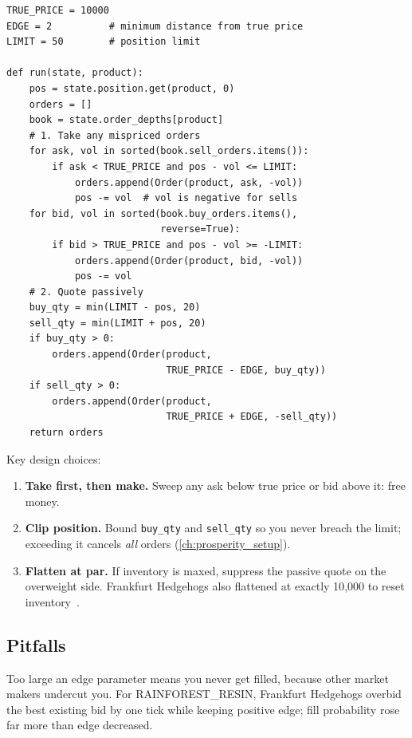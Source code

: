 \begin{lstlisting}[caption={Fixed-price market maker (Prosperity).},
  label={lst:static_mm}]
TRUE_PRICE = 10000
EDGE = 2          # minimum distance from true price
LIMIT = 50        # position limit

def run(state, product):
    pos = state.position.get(product, 0)
    orders = []
    book = state.order_depths[product]
    # 1. Take any mispriced orders
    for ask, vol in sorted(book.sell_orders.items()):
        if ask < TRUE_PRICE and pos - vol <= LIMIT:
            orders.append(Order(product, ask, -vol))
            pos -= vol  # vol is negative for sells
    for bid, vol in sorted(book.buy_orders.items(),
                           reverse=True):
        if bid > TRUE_PRICE and pos - vol >= -LIMIT:
            orders.append(Order(product, bid, -vol))
            pos -= vol
    # 2. Quote passively
    buy_qty = min(LIMIT - pos, 20)
    sell_qty = min(LIMIT + pos, 20)
    if buy_qty > 0:
        orders.append(Order(product,
                            TRUE_PRICE - EDGE, buy_qty))
    if sell_qty > 0:
        orders.append(Order(product,
                            TRUE_PRICE + EDGE, -sell_qty))
    return orders
\end{lstlisting}

\noindent
Key design choices:
\begin{enumerate}
  \item \textbf{Take first, then make.}  Sweep any ask below true
  price or bid above it: free money.
  \item \textbf{Clip position.}  Bound \texttt{buy\_qty} and
  \texttt{sell\_qty} so you never breach the limit; exceeding it
  cancels \emph{all} orders (\cref{ch:prosperity_setup}).
  \item \textbf{Flatten at par.}  If inventory is maxed, suppress the
  passive quote on the overweight side.  Frankfurt Hedgehogs also
  flattened at exactly 10{,}000 to reset
  inventory~\citep{frankfurthedgehogs2025}.
\end{enumerate}

\subsection{Pitfalls}

\begin{pitfallbox}
Too large an edge parameter means you never get filled, because other
market makers undercut you.  For RAINFOREST\_RESIN, Frankfurt Hedgehogs
overbid the best existing bid by one tick while keeping positive
edge; fill probability rose far more than edge decreased.
\end{pitfallbox}

